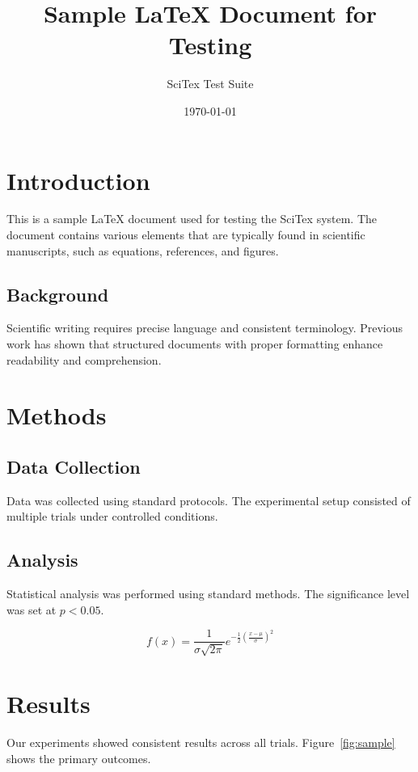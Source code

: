 \documentclass{article}
\title{Sample LaTeX Document for Testing}
\author{SciTex Test Suite}
\date{\today}
\begin{document}
\maketitle

\section{Introduction}

This is a sample LaTeX document used for testing the SciTex system. The document contains various elements that are typically found in scientific manuscripts, such as equations, references, and figures.

\subsection{Background}

Scientific writing requires precise language and consistent terminology. Previous work has shown that structured documents with proper formatting enhance readability and comprehension.

\section{Methods}

\subsection{Data Collection}

Data was collected using standard protocols. The experimental setup consisted of multiple trials under controlled conditions.

\subsection{Analysis}

Statistical analysis was performed using standard methods. The significance level was set at $p < 0.05$.

\begin{equation}
f(x) = \frac{1}{\sigma\sqrt{2\pi}} e^{-\frac{1}{2}\left(\frac{x-\mu}{\sigma}\right)^2}
\end{equation}

\section{Results}

Our experiments showed consistent results across all trials. Figure~\ref{fig:sample} shows the primary outcomes.
\end{document}
